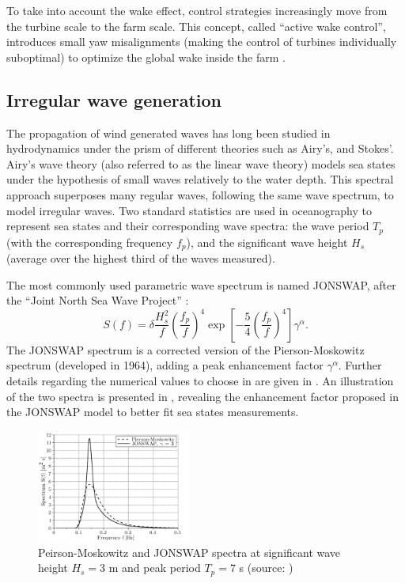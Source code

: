 To take into account the wake effect, control strategies increasingly move from the turbine scale to the farm scale. 
This concept, called ``active wake control'', introduces small yaw misalignments (making the control of turbines individually suboptimal) to optimize the global wake inside the farm \citep{rott_2018_active_control,simley_2020_active_control,meyers_2022_active_control}. 


\subsection{Irregular wave generation}

The propagation of wind generated waves has long been studied in hydrodynamics under the prism of different theories such as Airy's, and Stokes'. 
Airy's wave theory (also referred to as the linear wave theory) models sea states under the hypothesis of small waves relatively to the water depth.  
This spectral approach superposes many regular waves, following the same wave spectrum, to model irregular waves. 
Two standard statistics are used in oceanography to represent sea states and their corresponding wave spectra: 
the wave period $T_p$ (with the corresponding frequency $f_p$), and the significant wave height $H_s$ (average over the highest third of the waves measured). 

The most commonly used parametric wave spectrum is named JONSWAP, after the ``Joint North Sea Wave Project'' \citep{jonswap_1973}: 
\begin{equation}
    S(f) = \delta \frac{H_s^2}{f} \left(\frac{f_p}{f}\right)^4 \exp\left[-\frac54 \left(\frac{f_p}{f}\right)^4 \right] \gamma^\alpha.
    \label{eq:jonswap}
\end{equation}
The JONSWAP spectrum is a corrected version of the Pierson-Moskowitz spectrum (developed in 1964), adding a peak enhancement factor $\gamma^\alpha$. 
Further details regarding the numerical values to choose in  are given in \citet{burton_2021_wind_handbook}. 
An illustration of the two spectra is presented in , revealing the enhancement factor proposed in the JONSWAP model to better fit sea states measurements. 

\begin{figure}%
    \centering
    \includegraphics[width=0.45\textwidth]{./part1/figures/jonswap.png}
    \caption{Peirson-Moskowitz and JONSWAP spectra at significant wave height $H_s = 3$
    m and peak period $T_p = 7$ s (source: \citealt{milano_thesis_2021})}
    \label{fig:jonswap}
\end{figure}

